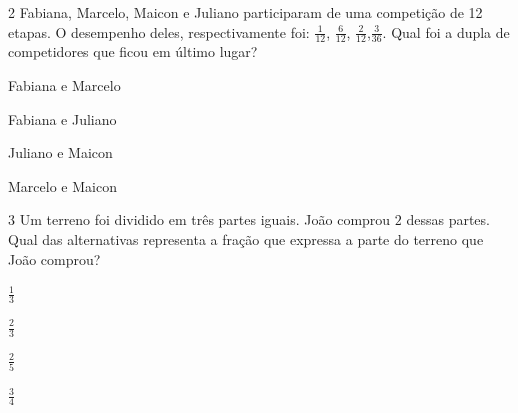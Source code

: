 

\num{2} Fabiana, Marcelo, Maicon e Juliano participaram de uma competição de
12 etapas. O desempenho deles, respectivamente foi: $\frac{1}{12}$,
$\frac{6}{12}$, $\frac{2}{12}$,$\frac{3}{36}$. Qual foi a dupla de
competidores que ficou em último lugar?

\begin{multicols}{2}
\begin{escolha}[itemsep=0pt]
\item
  Fabiana e Marcelo
\item
  Fabiana e Juliano
\item
  Juliano e Maicon
\item
  Marcelo e Maicon
\end{escolha}
\end{multicols}



\num{3} Um terreno foi dividido em três partes iguais. João comprou $2$ dessas
partes. Qual das alternativas representa a fração que expressa a parte
do terreno que João comprou?

\begin{escolha}[itemsep=0pt]
\item $\frac{1}{3}$
\item $\frac{2}{3}$
\item $\frac{2}{5}$
\item $\frac{3}{4}$
\end{escolha}

